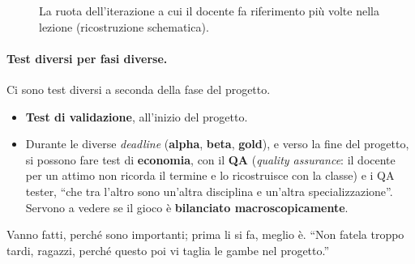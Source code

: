 \begin{figure}[htbp]
  \centering
  \caption{La ruota dell'iterazione a cui il docente fa riferimento più
  volte nella lezione (ricostruzione schematica).}
  \label{gd10:fig:ruota}
\end{figure}

\paragraph{Test diversi per fasi diverse.} Ci sono test diversi a seconda
della fase del progetto.
\begin{itemize}
  \item \textbf{Test di validazione}, all'inizio del progetto.
  \item Durante le diverse \emph{deadline} (\textbf{alpha}, \textbf{beta},
        \textbf{gold}), e verso la fine del progetto, si possono fare test
        di \textbf{economia}, con il \textbf{QA} (\emph{quality
        assurance}: il docente per un attimo non ricorda il termine e lo
        ricostruisce con la classe) e i QA tester, ``che tra l'altro sono
        un'altra disciplina e un'altra specializzazione''. Servono a vedere
        se il gioco è \textbf{bilanciato macroscopicamente}.
\end{itemize}
Vanno fatti, perché sono importanti; prima li si fa, meglio è. ``Non fatela
troppo tardi, ragazzi, perché questo poi vi taglia le gambe nel progetto.''

